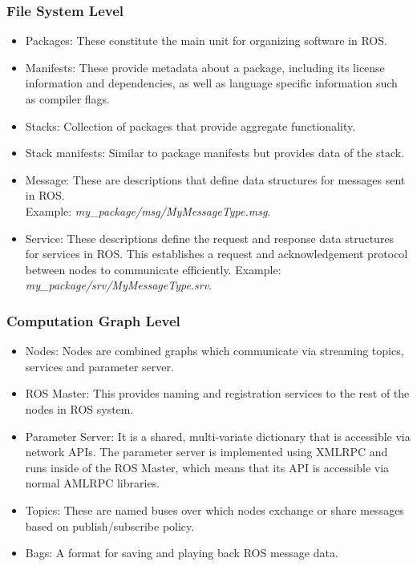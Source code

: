 \subsubsection{File System Level}
\begin{itemize}
    \item Packages: These constitute the main unit for organizing software in ROS\cite{48}.
    \item Manifests: These provide metadata about a package, including its license information and dependencies, as well as language specific information such as compiler flags.
    \item Stacks: Collection of packages that provide aggregate functionality.
    \item Stack manifests: Similar to package manifests but provides data of the stack.
    \item Message: These are descriptions that define data structures for messages sent in ROS.\\ Example: \textit{my\_package/msg/MyMessageType.msg}.
    \item Service: These descriptions define the request and response data structures for services in ROS. This establishes a request and acknowledgement protocol between nodes to communicate efficiently. Example: \textit{my\_package/srv/MyMessageType.srv}.
\end{itemize}

\subsubsection{Computation Graph Level}
\begin{itemize}
    \item Nodes: Nodes are combined graphs which communicate via streaming topics, services and parameter server\cite{33}.
    \item ROS Master: This provides naming and registration services to the rest of the nodes in ROS system.
    \item Parameter Server: It is a shared, multi-variate dictionary that is accessible via network APIs. The parameter server is implemented using XMLRPC and runs inside of the ROS Master, which means that its API is accessible via normal AMLRPC libraries\cite{33}.
    \item Topics: These are named buses over which nodes exchange or share messages based on publish/subscribe policy.
    \item Bags: A format for saving and playing back ROS message data.
\end{itemize}

